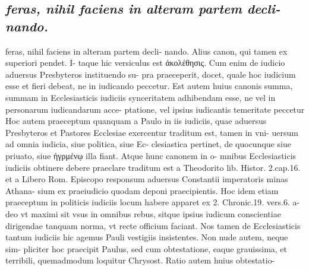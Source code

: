 \documentclass{article}
\begin{document}
\begin{pages}
\subsection*{\textit{feras, nihil faciens in alteram partem decli- nando.}}feras, nihil faciens in alteram partem decli- nando. Alius canon, qui tamen ex superiori pendet. I- taque hic versiculus est ἀκολέθησις. Cum enim de iudicio aduersus Presbyteros instituendo su- pra praeceperit, docet, quale hoc iudicium esse et fieri debeat, ne in iudicando peccetur. Est autem huius canonis summa, summam in Ecclesiasticis iudiciis synceritatem adhibendam esse, ne vel in personarum iudicandarum acce- ptatione, vel ipsius iudicantis temeritate peccetur Hoc autem praeceptum quanquam a Paulo in iis iudiciis, quae aduersus Presbyteros et Pastores Ecclesiae exercentur traditum est, tamen in vni- uersum ad omnia iudicia, siue politica, siue Ec- clesiastica pertinet, de quocunque siue priuato, siue ἠγρμένῳ illa fiant. Atque hunc canonem in o- mnibus Ecclesiasticis iudiciis obtinere debere praeclare traditum est a Theodorito lib.  Histor. 2.cap.16. et a Libero Rom. Episcopo responsum aduersus Constantii imperatoris minas Athana- sium ex praeiudicio quodam deponi praecipientis. Hoc idem etiam praeceptum in politicis iudiciis locum habere apparet ex 2. Chronic.19. vers.6. a- deo vt maximi sit vsus in omnibus rebus, sitque ipsius iudicum conscientiae dirigendae tanquam norma, vt recte officium faciant. Nos tamen de Ecclesiasticis tantum iudiciis hic agemus Pauli vestigiis insistentes. Non nude autem, neque sim- pliciter hoc praecipit Paulus, sed cum obtestatione, eaque grauissima, et terribili, quemadmodum loquitur Chrysost. Ratio autem huius obtestatio-  \pend

\end{pages}
\end{document}
